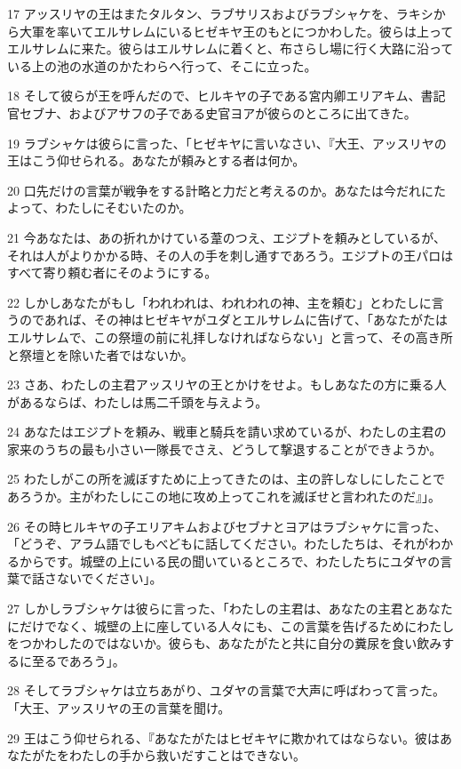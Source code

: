 \par 17 アッスリヤの王はまたタルタン、ラブサリスおよびラブシャケを、ラキシから大軍を率いてエルサレムにいるヒゼキヤ王のもとにつかわした。彼らは上ってエルサレムに来た。彼らはエルサレムに着くと、布さらし場に行く大路に沿っている上の池の水道のかたわらへ行って、そこに立った。
\par 18 そして彼らが王を呼んだので、ヒルキヤの子である宮内卿エリアキム、書記官セブナ、およびアサフの子である史官ヨアが彼らのところに出てきた。
\par 19 ラブシャケは彼らに言った、「ヒゼキヤに言いなさい、『大王、アッスリヤの王はこう仰せられる。あなたが頼みとする者は何か。
\par 20 口先だけの言葉が戦争をする計略と力だと考えるのか。あなたは今だれにたよって、わたしにそむいたのか。
\par 21 今あなたは、あの折れかけている葦のつえ、エジプトを頼みとしているが、それは人がよりかかる時、その人の手を刺し通すであろう。エジプトの王パロはすべて寄り頼む者にそのようにする。
\par 22 しかしあなたがもし「われわれは、われわれの神、主を頼む」とわたしに言うのであれば、その神はヒゼキヤがユダとエルサレムに告げて、「あなたがたはエルサレムで、この祭壇の前に礼拝しなければならない」と言って、その高き所と祭壇とを除いた者ではないか。
\par 23 さあ、わたしの主君アッスリヤの王とかけをせよ。もしあなたの方に乗る人があるならば、わたしは馬二千頭を与えよう。
\par 24 あなたはエジプトを頼み、戦車と騎兵を請い求めているが、わたしの主君の家来のうちの最も小さい一隊長でさえ、どうして撃退することができようか。
\par 25 わたしがこの所を滅ぼすために上ってきたのは、主の許しなしにしたことであろうか。主がわたしにこの地に攻め上ってこれを滅ぼせと言われたのだ』」。
\par 26 その時ヒルキヤの子エリアキムおよびセブナとヨアはラブシャケに言った、「どうぞ、アラム語でしもべどもに話してください。わたしたちは、それがわかるからです。城壁の上にいる民の聞いているところで、わたしたちにユダヤの言葉で話さないでください」。
\par 27 しかしラブシャケは彼らに言った、「わたしの主君は、あなたの主君とあなたにだけでなく、城壁の上に座している人々にも、この言葉を告げるためにわたしをつかわしたのではないか。彼らも、あなたがたと共に自分の糞尿を食い飲みするに至るであろう」。
\par 28 そしてラブシャケは立ちあがり、ユダヤの言葉で大声に呼ばわって言った。「大王、アッスリヤの王の言葉を聞け。
\par 29 王はこう仰せられる、『あなたがたはヒゼキヤに欺かれてはならない。彼はあなたがたをわたしの手から救いだすことはできない。
